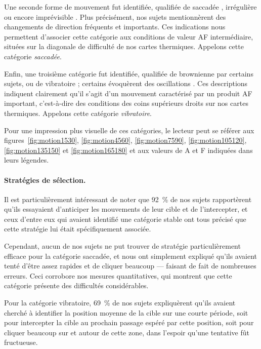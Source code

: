 	Une seconde forme de mouvement fut identifiée, qualifiée de \og saccadée \fg{}, \og irrégulière \fg{} ou encore \og imprévisible \fg{}. Plus précisément, nos sujets mentionnèrent des changements de direction fréquents et importants. Ces indications nous permettent d'associer cette catégorie aux conditions de valeur AF intermédiaire, situées sur la \og diagonale de difficulté \fg{} de nos cartes thermiques. Appelons cette catégorie \emph{saccadée}.
	
	Enfin, une troisième catégorie fut identifiée, qualifiée de \og brownienne \fg{} par certains sujets, ou de \og vibratoire \fg{} ; certains évoquèrent des \og oscillations \fg{}. Ces descriptions indiquent clairement qu'il s'agit d'un mouvement caractérisé par un produit AF important, c'est-à-dire des conditions des coins supérieurs droits sur nos cartes thermiques. Appelons cette catégorie \emph{vibratoire}.
	
	Pour une impression plus visuelle de ces catégories, le lecteur peut se référer aux figures~\ref{fig:motion1530}, \ref{fig:motion4560}, \ref{fig:motion7590}, \ref{fig:motion105120}, \ref{fig:motion135150} et \ref{fig:motion165180} et aux valeurs de A et F indiquées dans leurs légendes.
	
	\paragraph{Stratégies de sélection.}
	Il est particulièrement intéressant de noter que 92~\%{} de nos sujets rapportèrent qu'ils essayaient d'anticiper les mouvements de leur cible et de l'intercepter, et ceux d'entre eux qui avaient identifié une catégorie stable ont tous précisé que cette stratégie lui était spécifiquement associée.
	
	Cependant, aucun de nos sujets ne put trouver de stratégie particulièrement efficace pour la catégorie saccadée, et nous ont simplement expliqué qu'ils avaient tenté d'être assez rapides et de cliquer beaucoup --- faisant de fait de nombreuses erreurs. Ceci corrobore nos mesures quantitatives, qui montrent que cette catégorie présente des difficultés considérables.
	
	Pour la catégorie vibratoire, 69~\%{} de nos sujets expliquèrent qu'ils avaient cherché à identifier la position \og moyenne \fg{} de la cible sur une courte période, soit pour intercepter la cible au prochain passage espéré par cette position, soit pour cliquer beaucoup sur et autour de cette zone, dans l'espoir qu'une tentative fût fructueuse.

